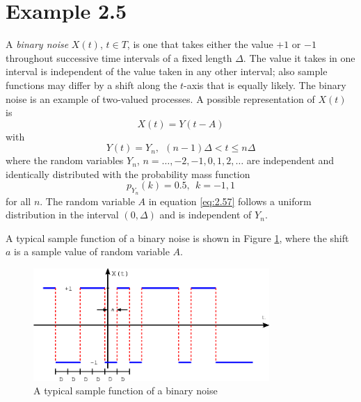 \documentclass[12pt,letterpaper]{article}
\begin{document}
\section*{Example 2.5}
A \textsl{binary noise} $X(t)$, $t \in T$, is one that takes either the value $+1$ or $-1$ throughout successive time intervals of a fixed length $\Delta$. The value it takes in one interval is independent of the value taken in any other interval; also sample functions may differ by a shift along the $t$-axis that is equally likely. The binary noise is an example of two-valued processes. A possible representation of $X(t)$ is 
\begin{equation}
X(t) = Y(t-A) \label{eq:2.57}
\end{equation}
with 
\begin{equation}
Y(t) = Y_{n},  \ \ (n-1) \Delta < t \leq n \Delta \label{eq:2.58}
\end{equation}
where the random variables $Y_n$, $n = \ldots, -2, -1, 0, 1, 2, \ldots$ are independent and identically distributed with the probability mass function 
\begin{equation}
p_{Y_n}(k) = 0.5, \ \ k = -1, 1
\end{equation}
for all $n$. The random variable $A$ in equation \eqref{eq:2.57} follows a uniform distribution in the interval $(0,\Delta)$ and is independent of $Y_n$.

A typical sample function of a binary noise is shown in Figure \ref{fig:sample_binary_noise}, where the shift $a$ is a sample value of random variable $A$.
\begin{figure}[!hb]
\centering
{}
\includegraphics[width=0.8\textwidth]{sample_binary_noise.eps}
\caption{A typical sample function of a binary noise}
\label{fig:sample_binary_noise}
\end{figure}
\end{document}
